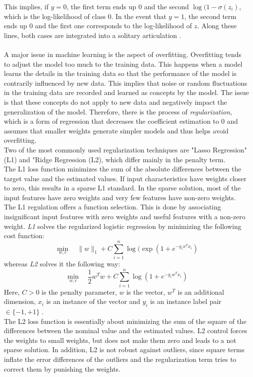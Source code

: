 \documentclass[a4paper, 11pt,titlepage,oneside,openany]{book}
\begin{document}
\noindent This implies, if $y=0$, the first term ends up $0$ and the second $\log(1-\sigma(z_i)$, which is the log-likelihood of class $0$. In the event that $y=1$, the second term ends up 0 and the first one corresponds to the log-likelihood of $z$. Along these lines, both cases are integrated into a solitary articulation \cite{algorithms}. \\
\\ A major issue in machine learning is the aspect of overfitting. Overfitting tends to adjust the model too much to the training data. This happens when a model learns the details in the training data so that the performance of the model is contrarily influenced by new data. This implies that noise or random fluctuations in the training data are recorded and learned as concepts by the model. The issue is that these concepts do not apply to new data and negatively impact the generalization of the model. Therefore, there is the process of \textit{regularization}, which is a form of regression that decreases the coefficient estimation to $0$ and assumes that smaller weights generate simpler models and thus helps avoid overfitting. \\
\noindent Two of the most commonly used regularization techniques are "Lasso Regression" (L1) and "Ridge Regression (L2), which differ mainly in the penalty term. \\
\noindent The L1 loss function minimizes the sum of the absolute differences between the target value and the estimated values. If input characteristics have weights closer to zero, this results in a sparse L1 standard. In the sparse solution, most of the input features have zero weights and very few features have non-zero weights. The L1 regulation offers a function selection. This is done by associating insignificant input features with zero weights and useful features with a non-zero weight. 
\noindent \textit{L1} solves the regularized logistic regression by minimizing the following cost function:
\[
\min_{w, c} \quad \|w\|_1 + C \sum_{i=1}^n \log(\exp(1+e^{-y_ix^Tx_i})
\]
whereas \textit{L2} solves it the following way:
\[
\min_{w, c} \quad \frac{1}{2}w^T w + C \sum_{i=1}^n \log(1+e^{-y_iw^Tx_i})
\]
Here, $C>0$ is the penalty parameter, $w$ is the vector, $w^T$ is an additional dimension, $x_i$ is an instance of the vector and $y_i$ is an instance label pair $\in \{-1,+1\}$ \cite{liblinear}.\\
The L2 loss function is essentially about minimizing the sum of the square of the differences between the nominal value and the estimated values.
L2 control forces the weights to small weights, but does not make them zero and leads to a not sparse solution. In addition, L2 is not robust against outliers, since square terms inflate the error differences of the outliers and the regularization term tries to correct them by punishing the weights.
\end{document}
